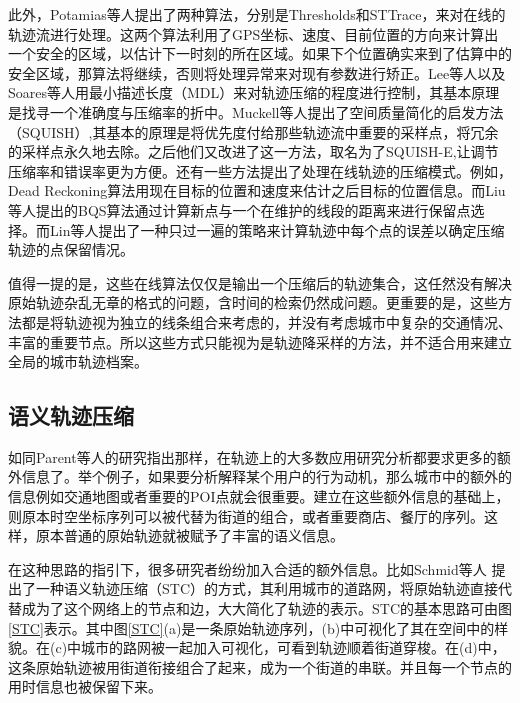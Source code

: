 此外，Potamias等人提出了两种算法，分别是Thresholds和STTrace，来对在线的轨迹流进行处理。这两个算法利用了GPS坐标、速度、目前位置的方向来计算出一个安全的区域，以估计下一时刻的所在区域。如果下个位置确实来到了估算中的安全区域，那算法将继续，否则将处理异常来对现有参数进行矫正。Lee等人以及Soares等人用最小描述长度（MDL）来对轨迹压缩的程度进行控制，其基本原理是找寻一个准确度与压缩率的折中。Muckell等人提出了空间质量简化的启发方法（SQUISH）,其基本的原理是将优先度付给那些轨迹流中重要的采样点，将冗余的采样点永久地去除。之后他们又改进了这一方法，取名为了SQUISH-E,让调节压缩率和错误率更为方便。还有一些方法提出了处理在线轨迹的压缩模式。例如，Dead Reckoning算法用现在目标的位置和速度来估计之后目标的位置信息。而Liu等人提出的BQS算法通过计算新点与一个在维护的线段的距离来进行保留点选择。而Lin等人提出了一种只过一遍的策略来计算轨迹中每个点的误差以确定压缩轨迹的点保留情况。

值得一提的是，这些在线算法仅仅是输出一个压缩后的轨迹集合，这任然没有解决原始轨迹杂乱无章的格式的问题，含时间的检索仍然成问题。更重要的是，这些方法都是将轨迹视为独立的线条组合来考虑的，并没有考虑城市中复杂的交通情况、丰富的重要节点。所以这些方式只能视为是轨迹降采样的方法，并不适合用来建立全局的城市轨迹档案。


\subsection{语义轨迹压缩}
如同Parent等人的研究指出那样，在轨迹上的大多数应用研究分析都要求更多的额外信息了。举个例子，如果要分析解释某个用户的行为动机，那么城市中的额外的信息例如交通地图或者重要的POI点就会很重要。建立在这些额外信息的基础上，则原本时空坐标序列可以被代替为街道的组合，或者重要商店、餐厅的序列。这样，原本普通的原始轨迹就被赋予了丰富的语义信息。



在这种思路的指引下，很多研究者纷纷加入合适的额外信息。比如Schmid等人 提出了一种语义轨迹压缩（STC）的方式，其利用城市的道路网，将原始轨迹直接代替成为了这个网络上的节点和边，大大简化了轨迹的表示。STC的基本思路可由图\ref{STC}表示。其中图\ref{STC}(a)是一条原始轨迹序列，(b)中可视化了其在空间中的样貌。在(c)中城市的路网被一起加入可视化，可看到轨迹顺着街道穿梭。在(d)中，这条原始轨迹被用街道衔接组合了起来，成为一个街道的串联。并且每一个节点的用时信息也被保留下来。


